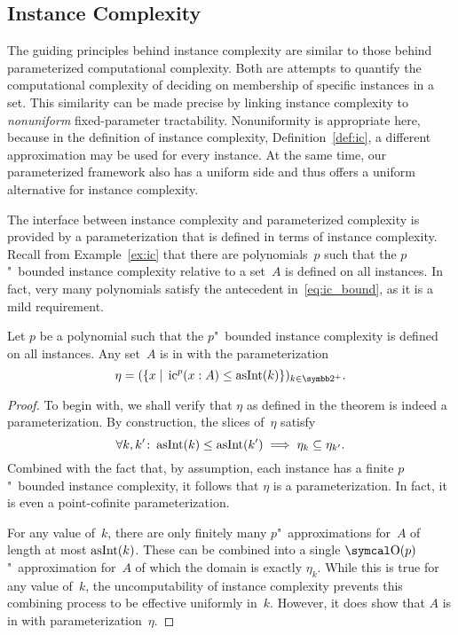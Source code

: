 \subsection{Instance Complexity}
\label{sec:algorithmic:ic}%
The guiding principles behind instance complexity are similar to those behind parameterized computational complexity.
Both are attempts to quantify the computational complexity of deciding on membership of specific instances in a set.
This similarity can be made precise by linking instance complexity to \emph{nonuniform} fixed-parameter tractability.
Nonuniformity is appropriate here, because in the definition of instance complexity, Definition~\ref{def:ic}, a different approximation may be used for every instance.
At the same time, our parameterized framework also has a uniform side and thus offers a uniform alternative for instance complexity.

The interface between instance complexity and parameterized complexity is provided by a parameterization that is defined in terms of instance complexity.
Recall from Example~\ref{ex:ic} that there are polynomials~$p$ such that the $p$"~bounded instance complexity relative to a set~$A$ is defined on all instances.
In fact, very many polynomials satisfy the antecedent in~\eqref{eq:ic_bound}, as it is a mild requirement.
\begin{theorem}
\label{thm:nufptic}%
  Let $p$ be a polynomial such that the $p$"~bounded instance complexity is defined on all instances.
  Any set~$A$ is in  with the parameterization
  \begin{equation*}
    \eta \deq (\{x \st \ic^p(x : A) \le \asNat(k)\})_{k \in \binary^+}.
  \end{equation*}
\end{theorem}
\begin{proof}
  To begin with, we shall verify that $\eta$ as defined in the theorem is indeed a parameterization.
  By construction, the slices of~$\eta$ satisfy
  \begin{equation*}
    \forall k, k'\colon \operatorname{asInt}(k) \le \operatorname{asInt}(k') \implies \eta_k \subseteq \eta_{k'}.
  \end{equation*}
  Combined with the fact that, by assumption, each instance has a finite $p$"~bounded instance complexity, it follows that $\eta$ is a parameterization.
  In fact, it is even a point-cofinite parameterization.

  For any value of~$k$, there are only finitely many $p$"~approximations for~$A$ of length at most $\operatorname{asInt}(k)$.
  These can be combined into a single $\bigO(p)$"~approximation for~$A$ of which the domain is exactly $\eta_k$.
  While this is true for any value of~$k$, the uncomputability of instance complexity prevents this combining process to be effective uniformly in~$k$.
  However, it does show that $A$ is in  with parameterization~$\eta$.
\end{proof}

